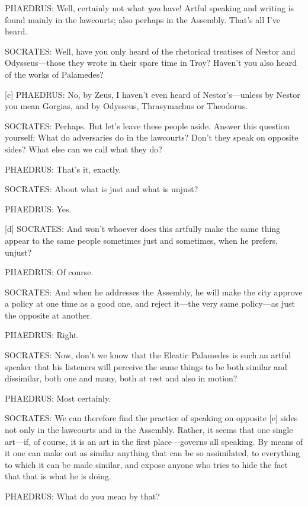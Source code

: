PHAEDRUS: Well, certainly not what {\em you} have! Artful speaking and
writing is found mainly in the lawcourts; also perhaps in the Assembly.
That's all I've heard.

SOCRATES: Well, have you only heard of the rhetorical treatises of
Nestor and Odysseus---those they wrote in their spare time in Troy?
Haven't you also heard of the works of
Palamedes?

{[}c{]} PHAEDRUS: No, by Zeus, I haven't even heard of Nestor's---unless
by Nestor you mean Gorgias, and by Odysseus, Thrasymachus or
Theodorus.

SOCRATES: Perhaps. But let's leave these people aside. Answer this
question yourself: What do adversaries do in the lawcourts? Don't they
speak on opposite sides? What else can we call what they do?

PHAEDRUS: That's it, exactly.

SOCRATES: About what is just and what is unjust?

PHAEDRUS: Yes.

{[}d{]} SOCRATES: And won't whoever does this artfully make the same
thing appear to the same people sometimes just and sometimes, when he
prefers, unjust?

PHAEDRUS: Of course.

SOCRATES: And when he addresses the Assembly, he will make the city
approve a policy at one time as a good one, and reject it---the very
same policy---as just the opposite at another.

PHAEDRUS: Right.

SOCRATES: Now, don't we know that the Eleatic Palamedes is such an
artful speaker that his listeners will perceive the same things to be
both similar and dissimilar, both one and many, both at rest and also in
motion?

PHAEDRUS: Most certainly.

SOCRATES: We can therefore find the practice of speaking on opposite
{[}e{]} sides not only in the lawcourts and in the Assembly. Rather, it
seems that one single art---if, of course, it is an art in the first
place---governs all speaking. By means of it one can make out as similar
anything that can be so assimilated, to everything to which it can be
made similar, and expose anyone who tries to hide the fact that that is
what he is doing.

PHAEDRUS: What do you mean by that?

